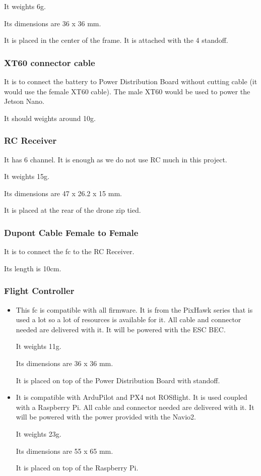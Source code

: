 It weights 6g.

Its dimensions are 36 x 36 mm.

It is placed in the center of the frame. It is attached with the 4 standoff.

\subsubsection{XT60 connector cable}
It is to connect the battery to Power Distribution Board without cutting cable (it would use the female XT60 cable). The male XT60 would be used to power the Jetson Nano.

It should weights around 10g.

\subsubsection{RC Receiver}
It has 6 channel. It is enough as we do not use RC much in this project.

It weights 15g.

Its dimensions are 47 x 26.2 x 15 mm.

It is placed at the rear of the drone zip tied.

\subsubsection{Dupont Cable Female to Female}
It is to connect the \gls{fc} to the RC Receiver.

Its length is 10cm.

\subsubsection{Flight Controller}
\begin{itemize}
    \item This \gls{fc} is compatible with all firmware. It is from the PixHawk series that is used a lot so a lot of resources is available for it. All cable and connector needed are delivered with it. It will be powered with the ESC BEC.

          It weights 11g.

          Its dimensions are 36 x 36 mm.

          It is placed on top of the Power Distribution Board with standoff.

    \item It is compatible with ArduPilot and PX4 not ROSflight. It is used coupled with a Raspberry Pi. All cable and connector needed are delivered with it. It will be powered with the power provided with the Navio2.

          It weights 23g.

          Its dimensions are 55 x 65 mm.

          It is placed on top of the Raspberry Pi.
\end{itemize}

